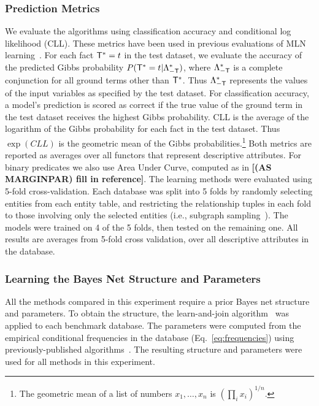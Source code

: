 \documentclass[runningheads,a4paper]{llncs}
\renewcommand{\marginpar}[1]{\fixneeded{(AS MARGINPAR) #1}}
\newcommand{\fixneeded}[1]{\textbf{[\footnotesize #1]}}
\begin{document}
\subsubsection{Prediction Metrics}
We evaluate the algorithms using classification
accuracy and conditional log likelihood (CLL). These metrics have been used in previous evaluations of MLN learning~\cite{Domingos2007,Schulte2012}.  For each fact $\mathsf{T}^{*}\hspace{0.0ex} = t$ in the test dataset, we evaluate the accuracy of the predicted Gibbs probability $P(\mathsf{T}^{*}\hspace{0.0ex} = t | \Lambda_{-\mathsf{T}}^{*}\hspace{0.0ex})$, where $\Lambda_{-\mathsf{T}}^{*}\hspace{0.0ex}$ is a complete conjunction for all ground terms other than $\mathsf{T}^{*}\hspace{0.0ex}$. Thus $\Lambda_{-\mathsf{T}}^{*}\hspace{0.0ex}$ represents the values of the input variables as specified by the test dataset.
For classification accuracy, a model's prediction is scored as correct if the true value of the ground term in the test dataset receives the highest Gibbs probability. 
CLL is the average of the logarithm of the Gibbs probability for each fact in the test dataset. Thus $\exp(CLL)$ is the geometric mean of the Gibbs probabilities.\footnote{The geometric mean of a list of numbers $x_{1},\ldots,x_{n}$ is $(\prod_{i} x_{i})^{1/n}$.}
Both metrics are reported as averages over all functors that represent descriptive attributes. For binary predicates we also use Area Under Curve, computed as in \marginpar{fill in reference}.
The learning methods were evaluated using 5-fold cross-validation. Each database was split into 5 folds by randomly selecting entities from each entity table, and restricting the relationship tuples in each fold to those involving only the selected entities  (i.e., subgraph sampling~\cite{Frank1977,Schulte2012}). The models were trained on 4 of the 5 folds, then tested on the remaining one. All results are averages from 5-fold cross validation, over all descriptive attributes in the database. 


\subsubsection{Learning the Bayes Net Structure and Parameters}

All the methods compared in this experiment require a prior Bayes net structure and parameters.
To obtain the structure, the learn-and-join algorithm~\cite{Schulte2012} was applied to each benchmark database. The parameters were computed from the empirical conditional frequencies in the database (Eq.~\ref{eq:frequencies}) using previously-published algorithms~\cite{Schulte2013}. The resulting structure and parameters were used for all methods in this experiment. 
 
\end{document}
